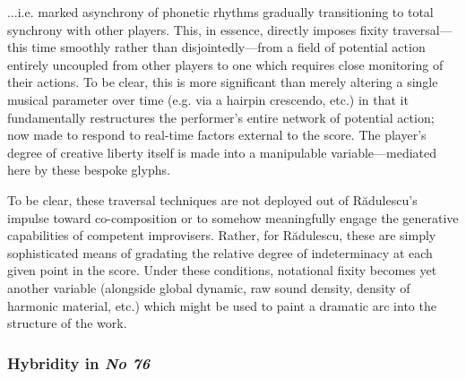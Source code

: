         \noindent...i.e. marked asynchrony of phonetic rhythms gradually transitioning to total synchrony with other players. This, in essence, directly imposes fixity traversal---this time smoothly rather than disjointedly---from a field of potential action entirely uncoupled from other players to one which requires close monitoring of their actions. To be clear, this is more significant than merely altering a single musical parameter over time (e.g. via a hairpin crescendo, etc.) in that it fundamentally restructures the performer's entire network of potential action; now made to respond to real-time factors external to the score. The player's degree of creative liberty itself is made into a manipulable variable---mediated here by these bespoke glyphs.

        To be clear, these traversal techniques are not deployed out of R\u{a}dulescu's impulse toward co-composition or to somehow meaningfully engage the generative capabilities of competent improvisers. Rather, for R\u{a}dulescu, these are simply sophisticated means of gradating the relative degree of indeterminacy at each given point in the score. Under these conditions, notational fixity becomes yet another variable (alongside global dynamic, raw sound density, density of harmonic material, etc.) which might be used to paint a dramatic arc into the structure of the work.


    \subsubsection{Hybridity in \textit{No 76}}

